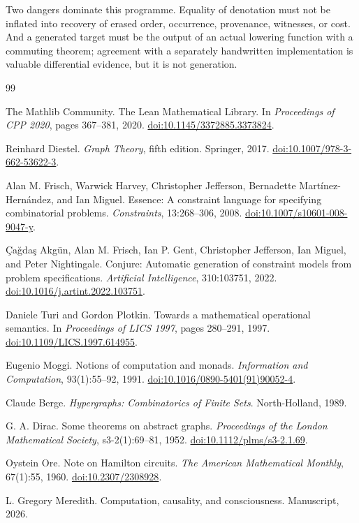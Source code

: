 \documentclass[11pt]{article}
\theoremstyle{remark}
\begin{document}
Two dangers dominate this programme.  Equality of denotation must not be
inflated into recovery of erased order, occurrence, provenance, witnesses, or
cost.  And a generated target must be the output of an actual lowering
function with a commuting theorem; agreement with a separately handwritten
implementation is valuable differential evidence, but it is not generation.

\begin{thebibliography}{99}

The Mathlib Community.
\newblock The Lean Mathematical Library.
\newblock In \emph{Proceedings of CPP 2020}, pages 367--381, 2020.
\newblock \href{https://doi.org/10.1145/3372885.3373824}{doi:10.1145/3372885.3373824}.

Reinhard Diestel.
\newblock \emph{Graph Theory}, fifth edition.
\newblock Springer, 2017.
\newblock \href{https://doi.org/10.1007/978-3-662-53622-3}{doi:10.1007/978-3-662-53622-3}.

Alan M. Frisch, Warwick Harvey, Christopher Jefferson,
Bernadette Mart\'inez-Hern\'andez, and Ian Miguel.
\newblock Essence: A constraint language for specifying combinatorial problems.
\newblock \emph{Constraints}, 13:268--306, 2008.
\newblock \href{https://doi.org/10.1007/s10601-008-9047-y}{doi:10.1007/s10601-008-9047-y}.

\c{C}a\u{g}da\c{s} Akg\"un, Alan M. Frisch, Ian P. Gent, Christopher Jefferson,
Ian Miguel, and Peter Nightingale.
\newblock Conjure: Automatic generation of constraint models from problem
specifications.
\newblock \emph{Artificial Intelligence}, 310:103751, 2022.
\newblock \href{https://doi.org/10.1016/j.artint.2022.103751}{doi:10.1016/j.artint.2022.103751}.

Daniele Turi and Gordon Plotkin.
\newblock Towards a mathematical operational semantics.
\newblock In \emph{Proceedings of LICS 1997}, pages 280--291, 1997.
\newblock \href{https://doi.org/10.1109/LICS.1997.614955}{doi:10.1109/LICS.1997.614955}.

Eugenio Moggi.
\newblock Notions of computation and monads.
\newblock \emph{Information and Computation}, 93(1):55--92, 1991.
\newblock \href{https://doi.org/10.1016/0890-5401(91)90052-4}{doi:10.1016/0890-5401(91)90052-4}.

Claude Berge.
\newblock \emph{Hypergraphs: Combinatorics of Finite Sets}.
\newblock North-Holland, 1989.

G. A. Dirac.
\newblock Some theorems on abstract graphs.
\newblock \emph{Proceedings of the London Mathematical Society},
s3-2(1):69--81, 1952.
\newblock \href{https://doi.org/10.1112/plms/s3-2.1.69}{doi:10.1112/plms/s3-2.1.69}.

Oystein Ore.
\newblock Note on Hamilton circuits.
\newblock \emph{The American Mathematical Monthly}, 67(1):55, 1960.
\newblock \href{https://doi.org/10.2307/2308928}{doi:10.2307/2308928}.

L. Gregory Meredith.
\newblock Computation, causality, and consciousness.
\newblock Manuscript, 2026.

\end{thebibliography}
\end{document}

